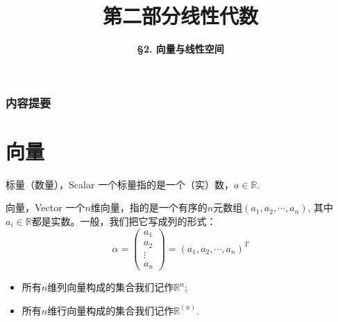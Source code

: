 \documentclass[10pt]{beamer}
\title[Linear Algebra]{\LARGE \bfseries 第二部分\quad 线性代数} %
\author[Vector and Linear Space] %
{\Large \bfseries \S 2. 向量与线性空间}
\date{}
\begin{document}

\begin{frame}

\titlepage %

\end{frame}


\begin{frame}
\frametitle{内容提要} %
\tableofcontents %
\end{frame}


\section{向量} %

\begin{frame}

\begin{block}{标量（数量），Scalar}
一个标量指的是一个（实）数，$a\in\mathbb{R}$.
\end{block}

\begin{block}{向量，Vector}
一个$n$维向量，指的是一个有序的$n$元数组$(a_1,a_2,\cdots,a_n)$, 其中$a_i\in\mathbb{R}$都是实数。一般，我们把它写成列的形式：
$$\alpha = \begin{pmatrix}
a_1 \\ a_2 \\ \vdots \\ a_n
\end{pmatrix} = (a_1,a_2,\cdots,a_n)^T$$

\pause

\begin{itemize}
\item 所有$n$维列向量构成的集合我们记作$\mathbb{R}^n$;
\item 所有$n$维行向量构成的集合我们记作$\mathbb{R}^{(n)}$.
\end{itemize}
\end{block}

\end{frame}
\end{document}
